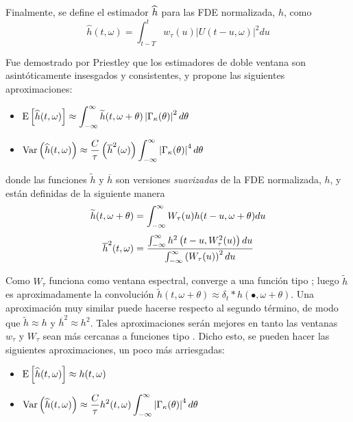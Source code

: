 Finalmente, se define el estimador $\widehat{ h }$ para las FDE normalizada, $h$, como
\begin{equation*}
\widehat{h}(t,\omega) = \int_{t-T}^{t} w_{\tau}(u) \lvert U(t-u,\omega) \lvert^{2} du
\label{estimador_doble_ventana}
\end{equation*}

Fue demostrado por Priestley \cite{Priestley65} que los estimadores de doble ventana son 
asintóticamente insesgados y consistentes, y propone las siguientes aproximaciones:
\begin{itemize}
\item $\displaystyle
\mathrm{E}\left[ \widehat{ h }(t,\omega) \right] \approx 
\int_{-\infty}^{\infty} \widetilde{h}(t,\omega+\theta) \left| \Gamma_\kappa(\theta) \right|^{2} d\theta$
\item $\displaystyle
\mathrm{Var}\left( \widehat{ h }(t,\omega) \right) \approx \frac{C}{\tau} \left( \overline{h}^{2}(\omega) \right)
\int_{-\infty}^{\infty} \left| \Gamma_\kappa(\theta) \right|^{4} d\theta $
\end{itemize}

donde las funciones $\widetilde{h}$ y $\overline{h}$ son versiones \textit{suavizadas} de la FDE 
normalizada, $h$, y están definidas de la siguiente manera
\begin{equation*}
\widetilde{h}(t,\omega+\theta) = 
\int_{-\infty}^{\infty} W_{\tau}(u) h(t-u,\omega+\theta) du
\end{equation*}
\begin{equation*}
\overline{h}^{2} (t,\omega) =
\frac{\int_{-\infty}^{\infty} h^{2}\left(t-u,W_{\tau}^{2}(u)\right) du}
{\int_{-\infty}^{\infty} \left( W_{\tau}(u) \right)^{2} du}
\end{equation*}

Como $W_{\tau}$ funciona como ventana espectral, converge a una 
función tipo \dirac; luego $\widetilde{h}$ es aproximadamente la convolución 
$\widetilde{h}(t,\omega+\theta) \approx \delta_t \ast h(\bullet,\omega+\theta)$. 
Una aproximación muy similar 
puede hacerse respecto al segundo término, de modo que $\widetilde{h}\approx h$ y 
$\overline{h}^{2}\approx h^{2}$.
Tales aproximaciones serán mejores en tanto las ventanas $w_{\tau}$ y $W_{\tau}$ sean más 
cercanas a funciones tipo \dirac.
Dicho esto, se pueden hacer las siguientes aproximaciones, un poco más arriesgadas:
\begin{itemize}
\item $\displaystyle \mathrm{E}\left[ \widehat{ h }(t,\omega) \right] \approx h(t,\omega)$
\item $\displaystyle \mathrm{Var}\left( \widehat{ h }(t,\omega) \right) \approx 
\frac{C}{\tau} h^{2}(t,\omega) \int_{-\infty}^{\infty} \left| \Gamma_\kappa (\theta) \right|^{4} d\theta$
\end{itemize}

